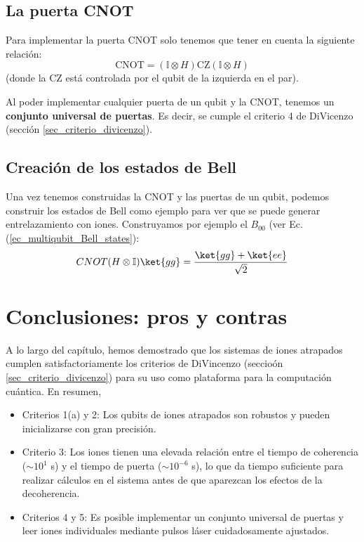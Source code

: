 \subsection{La puerta CNOT}

Para implementar la puerta CNOT solo tenemos que tener en cuenta la siguiente relación:
	\begin{equation} \label{ec_ions_CNOT_from_HCZH}
	\text{CNOT} = (\mathbb{I} \otimes H) \text{CZ} (\mathbb{I} \otimes H)
	\end{equation}
(donde la CZ está controlada por el qubit de la izquierda en el par).

Al poder implementar cualquier puerta de un qubit y la CNOT, tenemos un \textbf{conjunto universal de puertas}. Es decir, se cumple el criterio 4 de DiVicenzo (sección \ref{sec_criterio_divicenzo}).





\subsection{Creación de los estados de Bell}

Una vez tenemos construidas la CNOT y las puertas de un qubit, podemos construir los estados de Bell como ejemplo para ver que se puede generar entrelazamiento con iones. Construyamos por ejemplo el $B_{00}$ (ver Ec. (\ref{ec_multiqubit_Bell_states}):
	\begin{equation}
	CNOT (H \otimes \mathbb{I}) \ket{gg} = \frac{\ket{gg} + \ket{ee}}{\sqrt{2}}
	\end{equation}




\section{Conclusiones: pros y contras}


A lo largo del capítulo, hemos demostrado que los sistemas de iones atrapados cumplen satisfactoriamente los criterios de DiVincenzo (seccioón \ref{sec_criterio_divicenzo}) para su uso como plataforma para la computación cuántica. En resumen,
\begin{itemize}
\item  Criterios 1(a) y 2: Los qubits de iones atrapados son robustos y pueden inicializarse con gran precisión. 

\item Criterio 3: Los iones tienen una elevada relación entre el tiempo de coherencia ($\sim 10^1$ s) y el tiempo de puerta ($\sim 10^{-6}$ s), lo que da tiempo suficiente para realizar cálculos en el sistema antes de que aparezcan los efectos de la decoherencia.

\item Criterios 4 y 5: Es posible implementar un conjunto universal de puertas y leer iones individuales mediante pulsos láser cuidadosamente ajustados.

\end{itemize}

